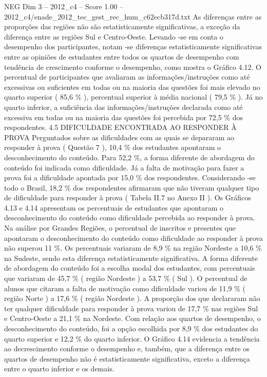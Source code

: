 \begin{textsample}{NEG Dim 3 – 2012\_c4 – Score 1.00 – 2012\_c4/enade\_2012\_tec\_gest\_rec\_hum\_c62ecb317d.txt}
As diferenças entre as proporções das regiões não são estatisticamente significativas, a exceção da diferença entre as regiões Sul e Centro-Oeste.
Levando -se em conta o desempenho dos participantes, notam -se diferenças estatisticamente significativas entre as opiniões de estudantes entre todos os quartos de desempenho com tendência de crescimento conforme o desempenho, como mostra o Gráfico 4.12.
O percentual de participantes que avaliaram as informações/instruções como até excessivas ou suficientes em todas ou na maioria das questões foi mais elevado no quarto superior ( 85,6 \% ), percentual superior à média nacional ( 79,5 \% ).
Já no quarto inferior, a suficiência das informações/instruções declarada como até excessiva em todas ou na maioria das questões foi percebida por 72,5 \% dos respondentes. 4.5 DIFICULDADE ENCONTRADA AO RESPONDER À PROVA Perguntados sobre as dificuldades com as quais se depararam ao responder à prova ( Questão 7 ), 10,4 \% dos estudantes apontaram o desconhecimento do conteúdo.
Para 52,2 \%, a forma diferente de abordagem do conteúdo foi indicada como dificuldade.
Já a falta de motivação para fazer a prova foi a dificuldade apontada por 15,0 \% dos respondentes.
Considerando -se todo o Brasil, 18,2 \% dos respondentes afirmaram que não tiveram qualquer tipo de dificuldade para responder à prova ( Tabela II.7 no Anexo II ).
Os Gráficos 4.13 e 4.14 apresentam os percentuais de estudantes que apontaram o desconhecimento do conteúdo como dificuldade percebida ao responder à prova.
Na análise por Grandes Regiões, o percentual de inscritos e presentes que apontaram o desconhecimento do conteúdo como dificuldade ao responder à prova não superou 11 \%.
Os percentuais variaram de 8,9 \% na região Nordeste a 10,6 \% na Sudeste, sendo esta diferença estatisticamente significativa.
A forma diferente de abordagem do conteúdo foi a escolha modal dos estudantes, com percentuais que variaram de 45,7 \% ( região Nordeste ) a 53,7 \% ( Sul ).
O percentual de alunos que citaram a falta de motivação como dificuldade variou de 11,9 \% ( região Norte ) a 17,6 \% ( região Nordeste ).
A proporção dos que declararam não ter qualquer dificuldade para responder à prova variou de 17,7 \% nas regiões Sul e Centro-Oeste a 21,1 \% na Nordeste.
Com relação aos quartos de desempenho, o desconhecimento do conteúdo, foi a opção escolhida por 8,9 \% dos estudantes do quarto superior e 12,2 \% do quarto inferior.
O Gráfico 4.14 evidencia a tendência ao decrescimento conforme o desempenho e, também, que a diferença entre os quartos de desempenho não é estatisticamente significativa, exceto a diferença entre o quarto inferior e os demais.

\end{textsample}
